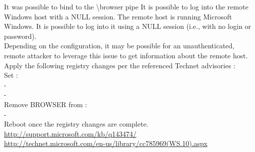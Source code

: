 \begin{tcolorbox}[
	title=Communication is not secure,
	colback=blue!5!white,
	colframe=blue!75!black,
	subtitle style={boxrule=0.4pt, colback=blue!50!white}	
	] 
	It was possible to bind to the \textbackslash browser pipe
It is possible to log into the remote Windows host with a NULL session.
The remote host is running Microsoft Windows. It is possible to log into it using a NULL session (i.e., with no login or password).\\
Depending on the configuration, it may be possible for an unauthenticated, remote attacker to leverage this issue to get information about the remote host.
Apply the following registry changes per the referenced Technet advisories :\\
Set :\\
-\\
-\\
Remove BROWSER from :\\
-\\ 
Reboot once the registry changes are complete.
\url{http://support.microsoft.com/kb/q143474/}\\
\url{http://technet.microsoft.com/en-us/library/cc785969(WS.10).aspx}
\end{tcolorbox}